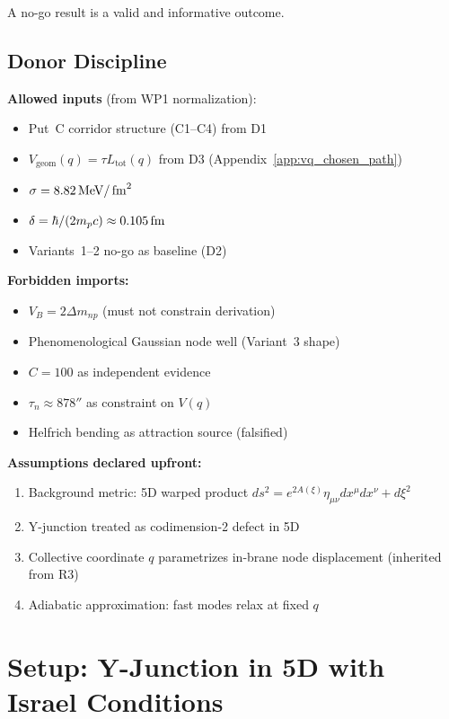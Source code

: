 A no-go result is a valid and informative outcome.

\subsection{Donor Discipline}

\textbf{Allowed inputs} (from WP1 normalization):
\begin{itemize}
    \item Put~C corridor structure (C1--C4) from D1 \tagDef
    \item $V_{\mathrm{geom}}(q) = \tau L_{\mathrm{tot}}(q)$ from D3
          (Appendix~\ref{app:vq_chosen_path}) \tagDc
    \item $\sigma = 8.82\,\mathrm{MeV}/\,\mathrm{fm}^2$ \tagDc
    \item $\delta = \hbar/(2 m_p c) \approx 0.105\,\mathrm{fm}$ \tagI
    \item Variants~1--2 no-go as baseline (D2) \tagDc
\end{itemize}

\textbf{Forbidden imports:}
\begin{itemize}
    \item $V_B = 2\Delta m_{np}$ (must not constrain derivation)
    \item Phenomenological Gaussian node well (Variant~3 shape)
    \item $C = 100$ as independent evidence
    \item $\tau_n \approx 878\second$ as constraint on $V(q)$
    \item Helfrich bending as attraction source (falsified)
\end{itemize}

\textbf{Assumptions declared upfront:}
\begin{enumerate}
    \item Background metric: 5D warped product
          $ds^2 = e^{2A(\xi)}\eta_{\mu\nu}dx^\mu dx^\nu + d\xi^2$ \tagI
    \item Y-junction treated as codimension-2 defect in 5D \tagDef
    \item Collective coordinate $q$ parametrizes in-brane node displacement
          (inherited from R3) \tagDc
    \item Adiabatic approximation: fast modes relax at fixed $q$ \tagP
\end{enumerate}

\section{Setup: Y-Junction in 5D with Israel Conditions}
\label{sec:P2WP2:setup}

